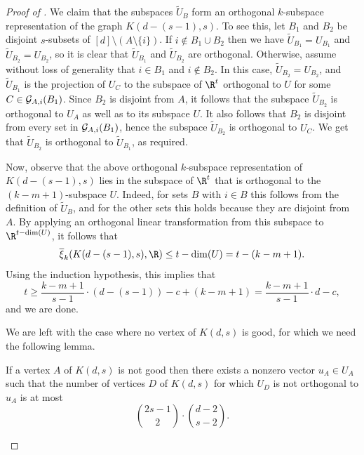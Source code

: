 \documentclass{toc}
\newcommand{\od}{\overline{\xi}}
\newcommand{\calG}{{\cal G}}
\begin{document}
\begin{proof}[Proof of ]
We claim that the subspaces $\widetilde{U}_B$ form an orthogonal $k$-subspace representation of the graph $K(d-(s-1),s)$.
To see this, let $B_1$ and $B_2$ be disjoint $s$-subsets of $[d] \setminus (A \setminus \{i\})$.
If $i \notin B_1 \cup B_2$ then we have $\widetilde{U}_{B_1} = U_{B_1}$ and $\widetilde{U}_{B_2} = U_{B_2}$, so it is clear that $\widetilde{U}_{B_1}$ and $\widetilde{U}_{B_2}$ are orthogonal. Otherwise, assume without loss of generality that $i \in B_1$ and $i \notin B_2$. In this case, $\widetilde{U}_{B_2} = U_{B_2}$, and $\widetilde{U}_{B_1}$ is the projection of $U_C$ to the subspace of $\R^t$ orthogonal to $U$ for some $C \in \calG_{A,i}(B_1)$.
Since $B_2$ is disjoint from $A$, it follows that the subspace $\widetilde{U}_{B_2}$ is orthogonal to $U_A$ as well as to its subspace $U$.
It also follows that $B_2$ is disjoint from every set in $\calG_{A,i}(B_1)$, hence the subspace $\widetilde{U}_{B_2}$ is orthogonal to $U_C$. We get that $\widetilde{U}_{B_2}$ is orthogonal to $\widetilde{U}_{B_1}$, as required.

Now, observe that the above orthogonal $k$-subspace representation of $K(d-(s-1),s)$ lies in the subspace of $\R^t$ that is orthogonal to the $(k-m+1)$-subspace $U$.
Indeed, for sets $B$ with $i \in B$ this follows from the definition of $\widetilde{U}_{B}$, and for the other sets this holds because they are disjoint from $A$.
By applying an orthogonal linear transformation from this subspace to $\R^{t-\dim(U)}$, it follows that \[\od_{k}(K(d-(s-1),s),\R) \leq t-\dim(U) = t-(k-m+1).\]
Using the induction hypothesis, this implies that
\[t \geq \frac{k-m+1}{s-1} \cdot (d-(s-1)) -c + (k-m+1)= \frac{k-m+1}{s-1} \cdot d-c,\]
and we are done.

We are left with the case where no vertex of $K(d,s)$ is good, for which we need the following lemma.

\begin{lemma}\label{lemma:bad_vertex}
If a vertex $A$ of $K(d,s)$ is not good then there exists a nonzero vector $u_A \in U_A$ such that the number of vertices $D$ of $K(d,s)$ for which $U_D$ is not orthogonal to $u_A$ is at most
\[\binom{2s-1}{2} \cdot \binom{d-2}{s-2}.\]
\end{lemma}


\end{proof}
\end{document}
